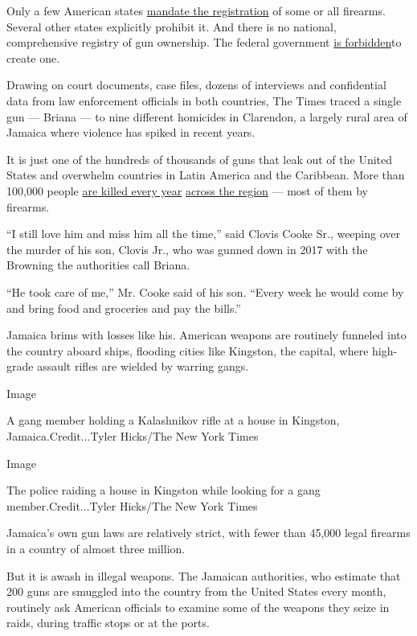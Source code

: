 Only a few American states
\href{https://lawcenter.giffords.org/gun-laws/policy-areas/gun-owner-responsibilities/registration/}{mandate
the registration} of some or all firearms. Several other states
explicitly prohibit it. And there is no national, comprehensive registry
of gun ownership. The federal government
\href{https://www.nraila.org/get-the-facts/registration-licensing/\#_edn4}{is
forbidden}to create one.

Drawing on court documents, case files, dozens of interviews and
confidential data from law enforcement officials in both countries, The
Times traced a single gun --- Briana --- to nine different homicides in
Clarendon, a largely rural area of Jamaica where violence has spiked in
recent years.

It is just one of the hundreds of thousands of guns that leak out of the
United States and overwhelm countries in Latin America and the
Caribbean. More than 100,000 people
\href{https://www.nytimes.com/2019/08/18/world/americas/guatemala-violence-women-asylum.html}{are
killed every year}
\href{https://www.nytimes.com/interactive/2019/05/04/world/americas/honduras-gang-violence.html}{across
the region} --- most of them by firearms.

``I still love him and miss him all the time,'' said Clovis Cooke Sr.,
weeping over the murder of his son, Clovis Jr., who was gunned down in
2017 with the Browning the authorities call Briana.

``He took care of me,'' Mr. Cooke said of his son. ``Every week he would
come by and bring food and groceries and pay the bills.''

Jamaica brims with losses like his. American weapons are routinely
funneled into the country aboard ships, flooding cities like Kingston,
the capital, where high-grade assault rifles are wielded by warring
gangs.

Image

A gang member holding a Kalashnikov rifle at a house in Kingston,
Jamaica.Credit...Tyler Hicks/The New York Times

Image

The police raiding a house in Kingston while looking for a gang
member.Credit...Tyler Hicks/The New York Times

Jamaica's own gun laws are relatively strict, with fewer than 45,000
legal firearms in a country of almost three million.

But it is awash in illegal weapons. The Jamaican authorities, who
estimate that 200 guns are smuggled into the country from the United
States every month, routinely ask American officials to examine some of
the weapons they seize in raids, during traffic stops or at the ports.

